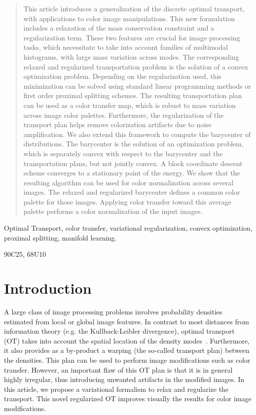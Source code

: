 
\begin{abstract}
	This article introduces a generalization of  the discrete optimal transport, with applications to color image manipulations. This new formulation includes a relaxation of the mass conservation constraint and a regularization term.  These two features are crucial for image processing tasks, which necessitate to take into account families of multimodal histograms, with large mass variation across modes.  	 
	 The corresponding relaxed and regularized transportation problem is the solution of a convex optimization problem. Depending on the regularization used, this minimization can be solved using standard linear programming methods or first order proximal splitting schemes.
	 The resulting transportation plan can be used as a color transfer map, which is robust to mass variation across image color palettes. Furthermore, the regularization of the transport plan helps remove colorization artifacts due to noise amplification.
	We also extend this framework to compute the barycenter of distributions. The barycenter is the solution of an optimization problem, which is separately convex with respect to the barycenter and the transportation plans, but not jointly convex. A block coordinate descent scheme converges to a stationary point of the energy. We show that the resulting algorithm can be used for color normalization across several images. The relaxed and regularized barycenter defines a common color palette for those images. Applying color transfer toward this average palette performs a color normalization of the input images.  
\end{abstract}

\begin{keywords}Optimal Transport, color transfer, variational regularization, convex optimization, proximal splitting, manifold learning.\end{keywords}

\begin{AMS}90C25, 68U10\end{AMS}



\section{Introduction}

A large class of image processing problems involves probability densities estimated from local or global image features. In contrast to most distances from information theory (e.g. the Kullback-Leibler divergence), optimal transport (OT) takes into account the spatial location of the density modes~\cite{Villani03}. Furthermore, it also provides as a by-product a warping (the so-called transport plan) between the densities. This plan can be used to perform image modifications such as color transfer. However, an important flaw of this OT plan is that it is in general highly irregular, thus introducing unwanted artifacts in the modified images. In this article, we propose a variational formalism to relax and regularize the transport. This novel regularized OT improves visually the results for color image modifications. 

